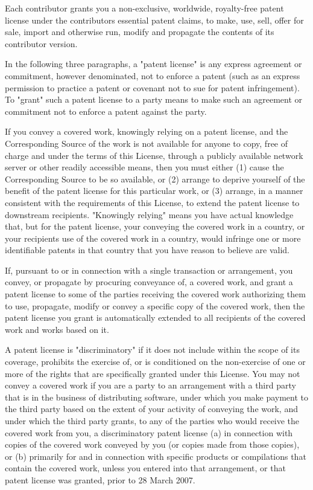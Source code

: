 Each contributor grants you a non-\/exclusive, worldwide, royalty-\/free patent license under the contributor\textquotesingle{}s essential patent claims, to make, use, sell, offer for sale, import and otherwise run, modify and propagate the contents of its contributor version.

In the following three paragraphs, a "{}patent license"{} is any express agreement or commitment, however denominated, not to enforce a patent (such as an express permission to practice a patent or covenant not to sue for patent infringement). To "{}grant"{} such a patent license to a party means to make such an agreement or commitment not to enforce a patent against the party.

If you convey a covered work, knowingly relying on a patent license, and the Corresponding Source of the work is not available for anyone to copy, free of charge and under the terms of this License, through a publicly available network server or other readily accessible means, then you must either (1) cause the Corresponding Source to be so available, or (2) arrange to deprive yourself of the benefit of the patent license for this particular work, or (3) arrange, in a manner consistent with the requirements of this License, to extend the patent license to downstream recipients. "{}\+Knowingly relying"{} means you have actual knowledge that, but for the patent license, your conveying the covered work in a country, or your recipient\textquotesingle{}s use of the covered work in a country, would infringe one or more identifiable patents in that country that you have reason to believe are valid.

If, pursuant to or in connection with a single transaction or arrangement, you convey, or propagate by procuring conveyance of, a covered work, and grant a patent license to some of the parties receiving the covered work authorizing them to use, propagate, modify or convey a specific copy of the covered work, then the patent license you grant is automatically extended to all recipients of the covered work and works based on it.

A patent license is "{}discriminatory"{} if it does not include within the scope of its coverage, prohibits the exercise of, or is conditioned on the non-\/exercise of one or more of the rights that are specifically granted under this License. You may not convey a covered work if you are a party to an arrangement with a third party that is in the business of distributing software, under which you make payment to the third party based on the extent of your activity of conveying the work, and under which the third party grants, to any of the parties who would receive the covered work from you, a discriminatory patent license (a) in connection with copies of the covered work conveyed by you (or copies made from those copies), or (b) primarily for and in connection with specific products or compilations that contain the covered work, unless you entered into that arrangement, or that patent license was granted, prior to 28 March 2007.

